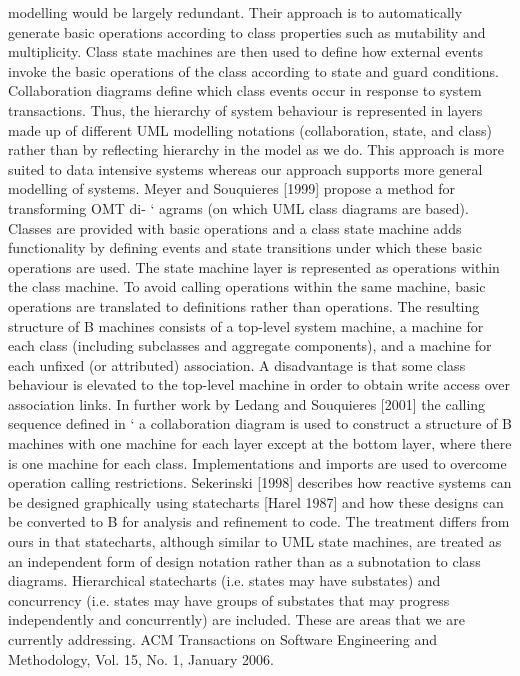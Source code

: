 modelling would be largely redundant. Their approach is to automatically generate basic operations according to class properties such as mutability and
multiplicity. Class state machines are then used to define how external events
invoke the basic operations of the class according to state and guard conditions.
Collaboration diagrams define which class events occur in response to system
transactions. Thus, the hierarchy of system behaviour is represented in layers
made up of different UML modelling notations (collaboration, state, and class)
rather than by reflecting hierarchy in the model as we do. This approach is more
suited to data intensive systems whereas our approach supports more general
modelling of systems.
Meyer and Souquieres [1999] propose a method for transforming OMT di- `
agrams (on which UML class diagrams are based). Classes are provided with
basic operations and a class state machine adds functionality by defining events
and state transitions under which these basic operations are used. The state
machine layer is represented as operations within the class machine. To avoid
calling operations within the same machine, basic operations are translated
to definitions rather than operations. The resulting structure of B machines
consists of a top-level system machine, a machine for each class (including
subclasses and aggregate components), and a machine for each unfixed (or attributed) association. A disadvantage is that some class behaviour is elevated
to the top-level machine in order to obtain write access over association links. In
further work by Ledang and Souquieres [2001] the calling sequence defined in `
a collaboration diagram is used to construct a structure of B machines with one
machine for each layer except at the bottom layer, where there is one machine
for each class. Implementations and imports are used to overcome operation
calling restrictions.
Sekerinski [1998] describes how reactive systems can be designed graphically using statecharts [Harel 1987] and how these designs can be converted
to B for analysis and refinement to code. The treatment differs from ours in
that statecharts, although similar to UML state machines, are treated as an
independent form of design notation rather than as a subnotation to class diagrams. Hierarchical statecharts (i.e. states may have substates) and concurrency (i.e. states may have groups of substates that may progress independently and concurrently) are included. These are areas that we are currently
addressing.
ACM Transactions on Software Engineering and Methodology, Vol. 15, No. 1, January 2006.
